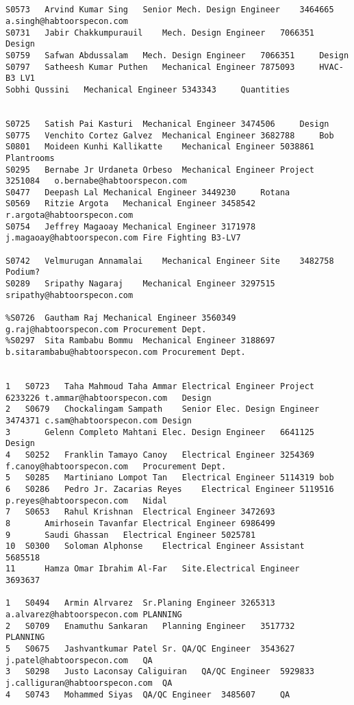 

\begin{verbatim}


S0573	Arvind Kumar Sing	Senior Mech. Design Engineer	3464665	     a.singh@habtoorspecon.com	
S0731	Jabir Chakkumpurauil	Mech. Design Engineer	7066351		Design
S0759	Safwan Abdussalam	Mech. Design Engineer	7066351		Design
S0797	Satheesh Kumar Puthen	Mechanical Engineer	7875093		HVAC-B3 LV1
Sobhi Qussini	Mechanical Engineer	5343343		Quantities


S0725	Satish Pai Kasturi	Mechanical Engineer	3474506		Design
S0775	Venchito Cortez Galvez	Mechanical Engineer	3682788		Bob
S0801	Moideen Kunhi Kallikatte	Mechanical Engineer	5038861		Plantrooms
S0295	Bernabe Jr Urdaneta Orbeso	Mechanical Engineer Project	3251084   o.bernabe@habtoorspecon.com	
S0477	Deepash Lal	Mechanical Engineer	3449230		Rotana
S0569	Ritzie Argota	Mechanical Engineer	3458542	r.argota@habtoorspecon.com	
S0754	Jeffrey Magaoay	Mechanical Engineer	3171978	j.magaoay@habtoorspecon.com	Fire Fighting B3-LV7

S0742	Velmurugan Annamalai	Mechanical Engineer Site 	3482758		Podium?
S0289	Sripathy Nagaraj	Mechanical Engineer	3297515	sripathy@habtoorspecon.com

%S0726	Gautham Raj	Mechanical Engineer	3560349	g.raj@habtoorspecon.com	Procurement Dept.
%S0297	Sita Rambabu Bommu	Mechanical Engineer	3188697	b.sitarambabu@habtoorspecon.com	Procurement Dept.


1	S0723	Taha Mahmoud Taha Ammar	Electrical Engineer Project	6233226	t.ammar@habtoorspecon.com	Design
2	S0679	Chockalingam Sampath	Senior Elec. Design Engineer	3474371	c.sam@habtoorspecon.com	Design
3		Gelenn Completo Mahtani	Elec. Design Engineer	6641125		Design
4	S0252	Franklin Tamayo Canoy	Electrical Engineer	3254369	f.canoy@habtoorspecon.com	Procurement Dept.
5	S0285	Martiniano Lompot Tan	Electrical Engineer	5114319	bob	
6	S0286	Pedro Jr. Zacarias Reyes	Electrical Engineer	5119516	p.reyes@habtoorspecon.com	Nidal
7	S0653	Rahul Krishnan	Electrical Engineer	3472693		
8		Amirhosein Tavanfar	Electrical Engineer	6986499		
9		Saudi Ghassan	Electrical Engineer	5025781		
10	S0300	Soloman Alphonse	Electrical Engineer Assistant	5685518		
11		Hamza Omar Ibrahim Al-Far	Site.Electrical Engineer	3693637		

1	S0494	Armin Alrvarez	Sr.Planing Engineer	3265313	a.alvarez@habtoorspecon.com	PLANNING
2	S0709	Enamuthu Sankaran	Planning Engineer	3517732		PLANNING
5	S0675	Jashvantkumar Patel	Sr. QA/QC Engineer	3543627	j.patel@habtoorspecon.com	QA
3	S0298	Justo Laconsay Caliguiran	QA/QC Engineer	5929833	j.calliguran@habtoorspecon.com	QA
4	S0743	Mohammed Siyas	QA/QC Engineer	3485607		QA


\end{verbatim}